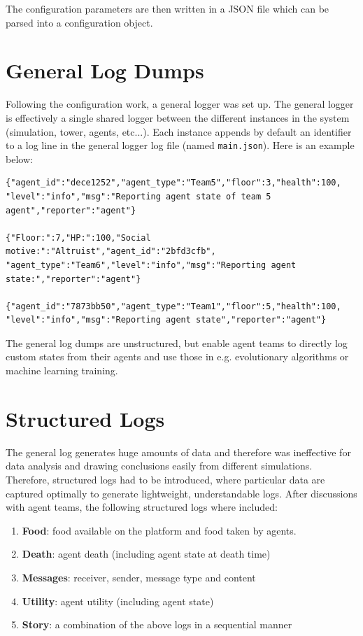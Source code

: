 The configuration parameters are then written in a JSON file which can be parsed into a configuration object.

\section{General Log Dumps}

Following the configuration work, a general logger was set up. The general logger is effectively a single shared logger between the different instances in the system (simulation, tower, agents, etc...). Each instance appends by default an identifier to a log line in the general logger log file (named \texttt{main.json}). Here is an example below:

\begin{verbatim}
{"agent_id":"dece1252","agent_type":"Team5","floor":3,"health":100,
"level":"info","msg":"Reporting agent state of team 5 agent","reporter":"agent"}

{"Floor:":7,"HP:":100,"Social motive:":"Altruist","agent_id":"2bfd3cfb",
"agent_type":"Team6","level":"info","msg":"Reporting agent state:","reporter":"agent"}

{"agent_id":"7873bb50","agent_type":"Team1","floor":5,"health":100,
"level":"info","msg":"Reporting agent state","reporter":"agent"}
\end{verbatim}

The general log dumps are unstructured, but enable agent teams to directly log custom states from their agents and use those in e.g. evolutionary algorithms or machine learning training.

\section{Structured Logs}

The general log generates huge amounts of data and therefore was ineffective for data analysis and drawing conclusions easily from different simulations. Therefore, structured logs had to be introduced, where particular data are captured optimally to generate lightweight, understandable logs. After discussions with agent teams, the following structured logs where included:

\begin{enumerate}
    \item \textbf{Food}: food available on the platform and food taken by agents.
    \item \textbf{Death}: agent death (including agent state at death time)
    \item \textbf{Messages}: receiver, sender, message type and content
    \item \textbf{Utility}: agent utility (including agent state)
    \item \textbf{Story}: a combination of the above logs in a sequential manner
\end{enumerate}


